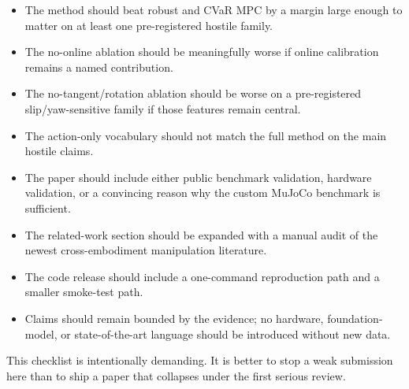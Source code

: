 \documentclass{article}
\begin{document}
\begin{itemize}
\item The method should beat robust and CVaR MPC by a margin large enough to matter on at least one pre-registered hostile family.
\item The no-online ablation should be meaningfully worse if online calibration remains a named contribution.
\item The no-tangent/rotation ablation should be worse on a pre-registered slip/yaw-sensitive family if those features remain central.
\item The action-only vocabulary should not match the full method on the main hostile claims.
\item The paper should include either public benchmark validation, hardware validation, or a convincing reason why the custom MuJoCo benchmark is sufficient.
\item The related-work section should be expanded with a manual audit of the newest cross-embodiment manipulation literature.
\item The code release should include a one-command reproduction path and a smaller smoke-test path.
\item Claims should remain bounded by the evidence; no hardware, foundation-model, or state-of-the-art language should be introduced without new data.
\end{itemize}

This checklist is intentionally demanding. It is better to stop a weak submission here than to ship a paper that collapses under the first serious review.



\end{document}
